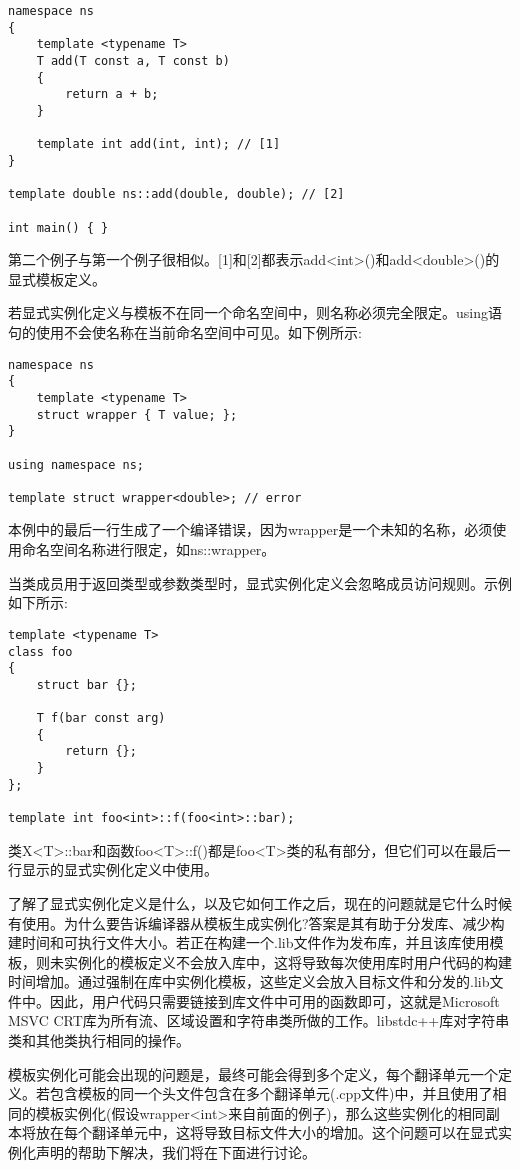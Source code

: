 \begin{lstlisting}[style=styleCXX]
namespace ns
{
	template <typename T>
	T add(T const a, T const b)
	{
		return a + b;
	}

	template int add(int, int); // [1]
}

template double ns::add(double, double); // [2]

int main() { }
\end{lstlisting}

第二个例子与第一个例子很相似。[1]和[2]都表示add<int>()和add<double>()的显式模板定义。

若显式实例化定义与模板不在同一个命名空间中，则名称必须完全限定。using语句的使用不会使名称在当前命名空间中可见。如下例所示:

\begin{lstlisting}[style=styleCXX]
namespace ns
{
	template <typename T>
	struct wrapper { T value; };
}

using namespace ns;

template struct wrapper<double>; // error
\end{lstlisting}

本例中的最后一行生成了一个编译错误，因为wrapper是一个未知的名称，必须使用命名空间名称进行限定，如ns::wrapper。

当类成员用于返回类型或参数类型时，显式实例化定义会忽略成员访问规则。示例如下所示:

\begin{lstlisting}[style=styleCXX]
template <typename T>
class foo
{
	struct bar {};
	
	T f(bar const arg)
	{
		return {};
	}
};

template int foo<int>::f(foo<int>::bar);
\end{lstlisting}

类X<T>::bar和函数foo<T>::f()都是foo<T>类的私有部分，但它们可以在最后一行显示的显式实例化定义中使用。

了解了显式实例化定义是什么，以及它如何工作之后，现在的问题就是它什么时候有使用。为什么要告诉编译器从模板生成实例化?答案是其有助于分发库、减少构建时间和可执行文件大小。若正在构建一个.lib文件作为发布库，并且该库使用模板，则未实例化的模板定义不会放入库中，这将导致每次使用库时用户代码的构建时间增加。通过强制在库中实例化模板，这些定义会放入目标文件和分发的.lib文件中。因此，用户代码只需要链接到库文件中可用的函数即可，这就是Microsoft MSVC CRT库为所有流、区域设置和字符串类所做的工作。libstdc++库对字符串类和其他类执行相同的操作。

模板实例化可能会出现的问题是，最终可能会得到多个定义，每个翻译单元一个定义。若包含模板的同一个头文件包含在多个翻译单元(.cpp文件)中，并且使用了相同的模板实例化(假设wrapper<int>来自前面的例子)，那么这些实例化的相同副本将放在每个翻译单元中，这将导致目标文件大小的增加。这个问题可以在显式实例化声明的帮助下解决，我们将在下面进行讨论。

